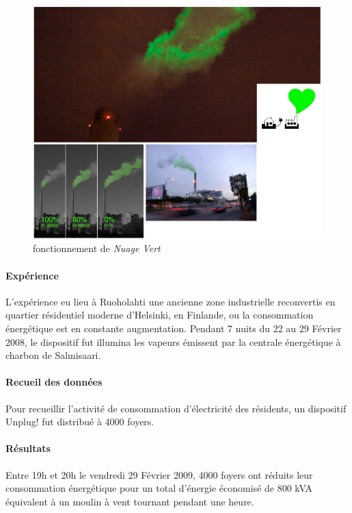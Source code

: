 \documentclass[10pt,a5paper,twoside]{article}
\begin{document}
\begin{figure}
\centering
\includegraphics[]{images/nuagevert-screenshot2.png}
\caption{fonctionnement de \emph{Nuage Vert}}\label{fig:nuagevert2}
\end{figure}

\paragraph{Expérience}\label{expuxe9rience}

L'expérience eu lieu à Ruoholahti une ancienne zone industrielle
reconvertis en quartier résidentiel moderne d'Helsinki, en Finlande, ou
la consommation énergétique est en constante augmentation. Pendant 7
nuits du 22 au 29 Février 2008, le dispositif fut illumina les vapeurs
émissent par la centrale énergétique à charbon de Salmisaari.

\paragraph{Recueil des données}\label{recueil-des-donnuxe9es-5}

Pour recueillir l'activité de consommation d'électricité des résidents,
un dispositif Unplug! fut distribué à 4000 foyers.

\paragraph{Résultats}\label{ruxe9sultats}

Entre 19h et 20h le vendredi 29 Février 2009, 4000 foyers ont réduits
leur consommation énergétique pour un total d'énergie économisé de 800
kVA équivalent à un moulin à vent tournant pendant une heure.
\end{document}
